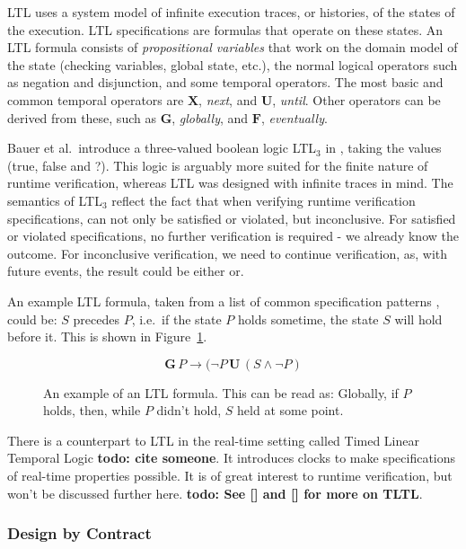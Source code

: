 \documentclass[a4paper,11pt]{kth-mag}
\newcommand{\todo}[1]{\textbf{todo: #1}}
\begin{document}
LTL uses a system model of infinite execution traces, or histories, of the
states of the execution. LTL specifications are formulas that operate on these
states. An LTL formula consists of \textit{propositional variables} that work
on the domain model of the state (checking variables, global state, etc.), the
normal logical operators such as negation and disjunction, and some temporal
operators. The most basic and common temporal operators are $\boldsymbol{X}$,
\textit{next}, and $\boldsymbol{U}$, \textit{until}. Other operators can be
derived from these, such as $\boldsymbol{G}$, \textit{globally}, and
$\boldsymbol{F}$, \textit{eventually}.

Bauer et al.\ introduce a three-valued boolean logic LTL$_3$ in
\cite{bauer06monitoring}, taking the values (true, false and ?). This logic is
arguably more suited for the finite nature of runtime verification, whereas LTL
was designed with infinite traces in mind. The semantics of LTL$_3$ reflect the
fact that when verifying runtime verification specifications, can not only
be satisfied or violated, but inconclusive. For satisfied or violated
specifications, no further verification is required - we already know the
outcome. For inconclusive verification, we need to continue verification, as,
with future events, the result could be either or.

An example LTL formula, taken from a list of common specification patterns
\cite{dwyer99patterns}, could be: $S$ precedes $P$, i.e.\, if the state $P$ holds
sometime, the state $S$ will hold before it. This is shown in
Figure~\ref{figure-ltl}.

\begin{figure}[h!]
	\[
	\boldsymbol{G} \, P \rightarrow (\neg P \, \boldsymbol{U} \, (S \wedge \neg P)
	\]

	\caption{An example of an LTL formula. This can be read as: Globally, if $P$
	holds, then, while $P$ didn't hold, $S$ held at some point.}
	\label{figure-ltl}
\end{figure}

There is a counterpart to LTL in the real-time setting called Timed Linear
Temporal Logic \todo{cite someone}. It introduces clocks to make specifications
of real-time properties possible. It is of great interest to runtime
verification, but won't be discussed further here. \todo{See [] and [] for more
on TLTL}.


\subsubsection{Design by Contract}
\end{document}
